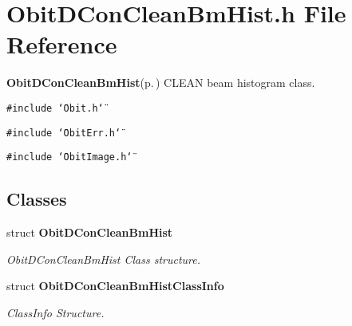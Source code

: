 \section{Obit\-DCon\-Clean\-Bm\-Hist.h File Reference}
\label{ObitDConCleanBmHist_8h}
{\bf Obit\-DCon\-Clean\-Bm\-Hist}{\rm (p.\,\pageref{structObitDConCleanBmHist})} CLEAN beam histogram class. 

{\tt \#include \char`\"{}Obit.h\char`\"{}}\par
{\tt \#include \char`\"{}Obit\-Err.h\char`\"{}}\par
{\tt \#include \char`\"{}Obit\-Image.h\char`\"{}}\par
\subsection*{Classes}
\begin{CompactItemize}
\item 
struct {\bf Obit\-DCon\-Clean\-Bm\-Hist}
\begin{CompactList}\small\item\em Obit\-DCon\-Clean\-Bm\-Hist Class structure. \item\end{CompactList}\item 
struct {\bf Obit\-DCon\-Clean\-Bm\-Hist\-Class\-Info}
\begin{CompactList}\small\item\em Class\-Info Structure. \item\end{CompactList}\end{CompactItemize}
